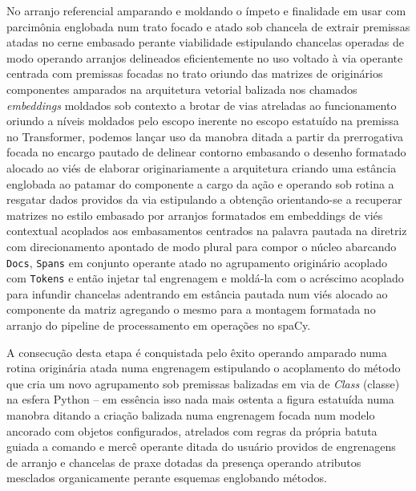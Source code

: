 \documentclass[
  brazilian,
]{article}
\begin{document}
No arranjo referencial amparando e moldando o ímpeto e finalidade em
usar com parcimônia englobada num trato focado e atado sob chancela de
extrair premissas atadas no cerne embasado perante viabilidade
estipulando chancelas operadas de modo operando arranjos delineados
eficientemente no uso voltado à via operante centrada com premissas
focadas no trato oriundo das matrizes de originários componentes
amparados na arquitetura vetorial balizada nos chamados
\emph{embeddings} moldados sob contexto a brotar de vias atreladas ao
funcionamento oriundo a níveis moldados pelo escopo inerente no escopo
estatuído na premissa no Transformer, podemos lançar uso da manobra
ditada a partir da prerrogativa focada no encargo pautado de delinear
contorno embasando o desenho formatado alocado ao viés de elaborar
originariamente a arquitetura criando uma estância englobada ao patamar
do componente a cargo da ação e operando sob rotina a resgatar dados
providos da via estipulando a obtenção orientando-se a recuperar
matrizes no estilo embasado por arranjos formatados em embeddings de
viés contextual acoplados aos embasamentos centrados na palavra pautada
na diretriz com direcionamento apontado de modo plural para compor o
núcleo abarcando \texttt{Docs}, \texttt{Spans} em conjunto operante
atado no agrupamento originário acoplado com \texttt{Tokens} e então
injetar tal engrenagem e moldá-la com o acréscimo acoplado para infundir
chancelas adentrando em estância pautada num viés alocado ao componente
da matriz agregando o mesmo para a montagem formatada no arranjo do
pipeline de processamento em operações no spaCy.

A consecução desta etapa é conquistada pelo êxito operando amparado numa
rotina originária atada numa engrenagem estipulando o acoplamento do
método que cria um novo agrupamento sob premissas balizadas em via de
\emph{Class} (classe) na esfera Python -- em essência isso nada mais
ostenta a figura estatuída numa manobra ditando a criação balizada numa
engrenagem focada num modelo ancorado com objetos configurados,
atrelados com regras da própria batuta guiada a comando e mercê operante
ditada do usuário providos de engrenagens de arranjo e chancelas de
praxe dotadas da presença operando atributos mesclados organicamente
perante esquemas englobando métodos.
\end{document}

